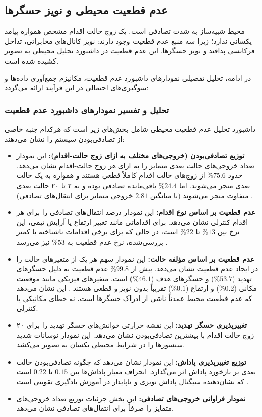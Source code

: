\documentclass[oneside,openany,a4paper,12pt]{article}
\begin{document}
\subsection{عدم قطعیت محیطی و نویز حسگرها}
محیط شبیه‌ساز به شدت تصادفی است. یک زوج حالت-اقدام مشخص همواره پیامد یکسانی ندارد؛ زیرا سه منبع عدم قطعیت وجود دارند: نویز کانال‌های مخابراتی، تداخل فرکانسی پدافند و نویز حسگرها. این عدم قطعیت در داشبورد تحلیل محیطی به تصویر کشیده شده است.

در ادامه، تحلیل تفصیلی نمودارهای داشبورد عدم قطعیت، مکانیزم جمع‌آوری داده‌ها و سوگیری‌های احتمالی در این فرآیند ارائه می‌گردد:

\subsubsection{تحلیل و تفسیر نمودارهای داشبورد عدم قطعیت}
داشبورد تحلیل عدم قطعیت محیطی شامل بخش‌های زیر است که هرکدام جنبه خاصی از تصادفی‌بودن سیستم را نشان می‌دهند:
\begin{itemize}
    \item \textbf{توزیع تصادفی‌بودن (خروجی‌های مختلف به ازای زوج حالت-اقدام):} این نمودار تعداد خروجی‌های حالت بعدی متمایز را به ازای هر زوج حالت-اقدام نشان می‌دهد. حدود $75.6$\% از زوج‌های حالت-اقدام کاملاً قطعی هستند و همواره به یک حالت بعدی منجر می‌شوند. اما $24.4$\% باقی‌مانده تصادفی بوده و به ۲ تا ۲۰ حالت بعدی متفاوت منجر می‌شوند (با میانگین $2.81$ خروجی متمایز برای انتقال‌های تصادفی) .
    \item \textbf{عدم قطعیت بر اساس نوع اقدام:} این نمودار درصد انتقال‌های تصادفی را برای هر اقدام کنترلی نشان می‌دهد. برای اقداماتی مانند تغییر ارتفاع یا آرایش تیمی، این نرخ بین $13$\% تا $22$\% است، در حالی که برای برخی اقدامات ناشناخته یا کمتر بررسی‌شده، نرخ عدم قطعیت به $53$\% نیز می‌رسد .
    \item \textbf{عدم قطعیت بر اساس مؤلفه حالت:} این نمودار سهم هر یک از متغیرهای حالت را در ایجاد عدم قطعیت نشان می‌دهد. بیش از $99.8$\% عدم قطعیت به دلیل حسگرهای تهدید ($53.7$\%) و حسگرهای هدف ($46.1$\%) است. متغیرهای فیزیکی مانند موقعیت مکانی ($0.2$\%) و ارتفاع ($0.1$\%) تقریباً بدون نویز و قطعی هستند . این نشان می‌دهد که عدم قطعیت محیط عمدتاً ناشی از ادراک حسگرها است، نه خطای مکانیکی یا کنترلی.
    \item \textbf{تغییرپذیری حسگر تهدید:} این نقشه حرارتی خوانش‌های حسگر تهدید را برای ۲۰ زوج حالت-اقدام با بیشترین تصادفی‌بودن نشان می‌دهد. این نمودار نوسانات شدید سنسورها را در شرایط محیطی یکسان به تصویر می‌کشد.
    \item \textbf{توزیع تغییرپذیری پاداش:} این نمودار نشان می‌دهد که چگونه تصادفی‌بودن حالت بعدی بر بازخورد پاداش اثر می‌گذارد. انحراف معیار پاداش‌ها بین $0.15$ تا $0.22$ است که نشان‌دهنده سیگنال پاداش نویزی و ناپایدار در آموزش یادگیری تقویتی است .
    \item \textbf{نمودار فراوانی خروجی‌های تصادفی:} این بخش جزئیات توزیع تعداد خروجی‌های متمایز را صرفاً برای انتقال‌های تصادفی نشان می‌دهد.
\end{itemize}
\end{document}
